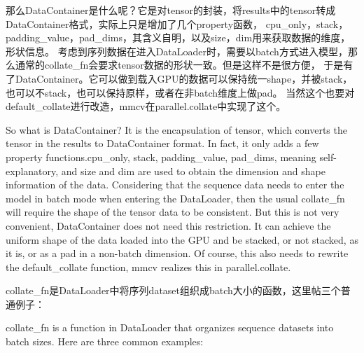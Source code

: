 \documentclass[UTF8]{ctexart}
\begin{document}
那么DataContainer是什么呢？它是对tensor的封装，将results中的tensor转成DataContainer格式，实际上只是增加了几个property函数，
cpu\_only，stack，padding\_value，pad\_dims，其含义自明，以及size，dim用来获取数据的维度，形状信息。
考虑到序列数据在进入DataLoader时，需要以batch方式进入模型，那么通常的collate\_fn会要求tensor数据的形状一致。但是这样不是很方便，
于是有了DataContainer。它可以做到载入GPU的数据可以保持统一shape，并被stack，也可以不stack，也可以保持原样，或者在非batch维度上做pad。
当然这个也要对default\_collate进行改造，mmcv在parallel.collate中实现了这个。

So what is DataContainer? It is the encapsulation of tensor, which converts the tensor in the results to DataContainer format. 
In fact, it only adds a few property functions.cpu\_only, stack, padding\_value, pad\_dims, meaning self-explanatory, and size 
and dim are used to obtain the dimension and shape information of the data. Considering that the sequence data needs to enter 
the model in batch mode when entering the DataLoader, then the usual collate\_fn will require the shape of the tensor data to 
be consistent. But this is not very convenient, DataContainer does not need this restriction. It can achieve the uniform shape 
of the data loaded into the GPU and be stacked, or not stacked, as it is, or as a pad in a non-batch dimension. Of course, this 
also needs to rewrite the default\_collate function, mmcv realizes this in parallel.collate.

collate\_fn是DataLoader中将序列dataset组织成batch大小的函数，这里帖三个普通例子：

collate\_fn is a function in DataLoader that organizes sequence datasets into batch sizes. Here are three common examples:
\end{document}
